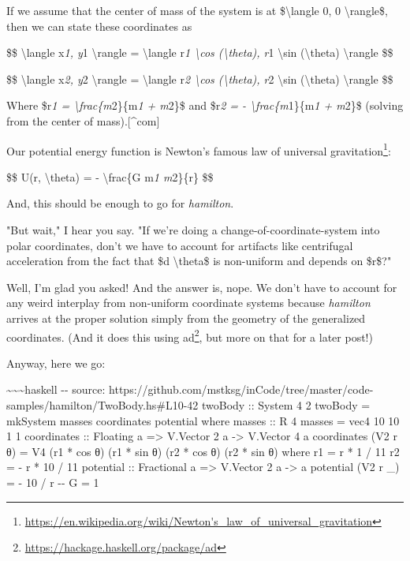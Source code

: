 \documentclass[]{article}
\renewcommand{\href}[2]{#2\footnote{\url{#1}}}
\begin{document}
If we assume that the center of mass of the system is at
\$\textbackslash{}langle 0, 0 \textbackslash{}rangle\$, then we can state these
coordinates as

\$\$ \textbackslash{}langle x\emph{1, y}1 \textbackslash{}rangle =
\textbackslash{}langle r\emph{1 \textbackslash{}cos (\textbackslash{}theta), r}1
\textbackslash{}sin (\textbackslash{}theta) \textbackslash{}rangle \$\$

\$\$ \textbackslash{}langle x\emph{2, y}2 \textbackslash{}rangle =
\textbackslash{}langle r\emph{2 \textbackslash{}cos (\textbackslash{}theta), r}2
\textbackslash{}sin (\textbackslash{}theta) \textbackslash{}rangle \$\$

Where \$r\emph{1 = \textbackslash{}frac\{m}2\}\{m\emph{1 + m}2\}\$ and
\$r\emph{2 = - \textbackslash{}frac\{m}1\}\{m\emph{1 + m}2\}\$ (solving from the
center of mass).{[}\^{}com{]}

Our potential energy function is Newton's famous
\href{https://en.wikipedia.org/wiki/Newton's_law_of_universal_gravitation}{law
of universal gravitation}:

\$\$ U(r, \textbackslash{}theta) = - \textbackslash{}frac\{G m\emph{1 m}2\}\{r\}
\$\$

And, this should be enough to go for \emph{hamilton}.

"But wait," I hear you say. "If we're doing a change-of-coordinate-system into
polar coordinates, don't we have to account for artifacts like centrifugal
acceleration from the fact that \$d \textbackslash{}theta\$ is non-uniform and
depends on \$r\$?"

Well, I'm glad you asked! And the answer is, nope. We don't have to account for
any weird interplay from non-uniform coordinate systems because \emph{hamilton}
arrives at the proper solution simply from the geometry of the generalized
coordinates. (And it does this using
\href{https://hackage.haskell.org/package/ad}{ad}, but more on that for a later
post!)

Anyway, here we go:

\textasciitilde{}\textasciitilde{}\textasciitilde{}haskell -\/- source:
https://github.com/mstksg/inCode/tree/master/code-samples/hamilton/TwoBody.hs\#L10-42
twoBody :: System 4 2 twoBody = mkSystem masses coordinates potential where
masses :: R 4 masses = vec4 10 10 1 1 coordinates :: Floating a =\textgreater{}
V.Vector 2 a -\textgreater{} V.Vector 4 a coordinates (V2 r θ) = V4 (r1 * cos θ)
(r1 * sin θ) (r2 * cos θ) (r2 * sin θ) where r1 = r * 1 / 11 r2 = - r * 10 / 11
potential :: Fractional a =\textgreater{} V.Vector 2 a -\textgreater{} a
potential (V2 r \_) = - 10 / r -\/- G = 1
\end{document}
